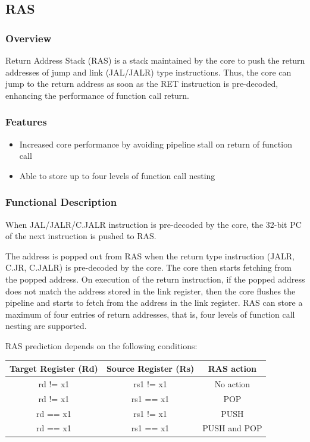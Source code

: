 \documentclass[main\_\_EN.tex]{subfiles}
\begin{document}

\subsection{RAS}
\label{sec:riscvcpu-perf-ras}

\subsubsection{Overview}
\label{sec:riscvcpu-perf-ras-overview}
Return Address Stack (RAS) is a stack maintained by the core to push the return addresses of jump and link (JAL/JALR) type instructions. Thus, the core can jump to the return address as soon as the RET instruction is pre-decoded, enhancing the performance of function call return.

\subsubsection{Features}
\label{sec:riscvcpu-perf-ras-features}

\begin{itemize}
    \item Increased core performance by avoiding pipeline stall on return of function call
    \item Able to store up to four levels of function call nesting
\end{itemize}


\subsubsection{Functional Description}
\label{sec:riscvcpu-perf-ras-func-descr}
When JAL/JALR/C.JALR instruction is pre-decoded by the core, the 32-bit PC of the next instruction is pushed to RAS.

The address is popped out from RAS when the return type instruction (JALR, C.JR, C.JALR) is pre-decoded by the core. The core then starts fetching from the popped address. On execution of the return instruction, if the popped address does not match the address stored in the link register, then the core flushes the pipeline and starts to fetch from the address in the link register. RAS can store a maximum of four entries of return addresses, that is, four levels of function call nesting are supported.

RAS prediction depends on the following conditions:

\begin{longtable}{ | c | c | c | }
\hline\rowcolor{lightgray}
Target Register (Rd) & Source Register (Rs) & RAS action \\ \hline
\endfirsthead
\hline
rd != x1 & rs1 != x1 & No action \\ \hline
rd != x1 & rs1 == x1 & POP \\ \hline
rd == x1 & rs1 != x1 & PUSH \\ \hline
rd == x1 & rs1 == x1 & PUSH and POP \\ \hline
\end{longtable}
\end{document}
